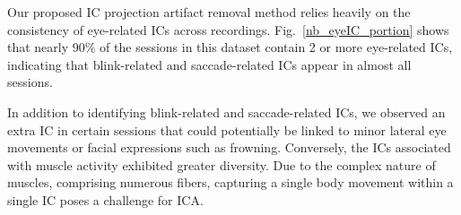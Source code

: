 \documentclass[journal]{IEEEtran}
\begin{document}
\par
Our proposed IC projection artifact removal method relies heavily on the consistency of eye-related ICs across recordings.
Fig.~\ref{nb_eyeIC_portion} shows that nearly 90\% of the sessions in this dataset contain 2 or more eye-related ICs, indicating that blink-related and saccade-related ICs appear in almost all sessions.

In addition to identifying blink-related and saccade-related ICs, we observed an extra IC in certain sessions that could potentially be linked to minor lateral eye movements or facial expressions such as frowning. Conversely, the ICs associated with muscle activity exhibited greater diversity. Due to the complex nature of muscles, comprising numerous fibers, capturing a single body movement within a single IC poses a challenge for ICA.

\end{document}
